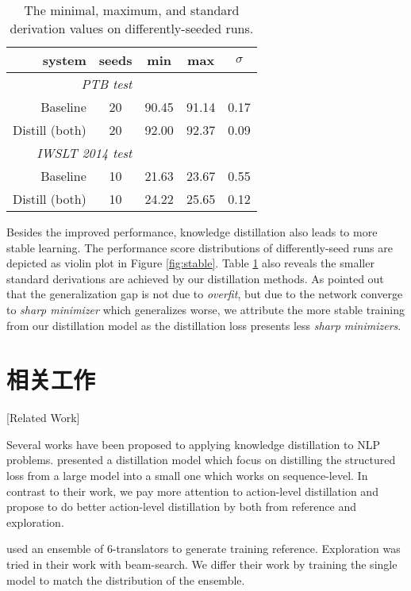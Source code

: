 \begin{table}[t]
	\centering
	\begin{tabular}{rcccc}
		\hline
		system & seeds & min & max & $\sigma$ \\
		\hline
		\multicolumn{2}{r}{\it PTB test} & & & \\
		Baseline & 20 & 90.45 & 91.14 & 0.17 \\
		Distill (both) & 20 & 92.00 & 92.37 & 0.09 \\
		\hline
		\hline
		\multicolumn{2}{r}{\it IWSLT 2014 test} & & & \\
		Baseline & 10 & 21.63 & 23.67 & 0.55 \\
		Distill (both) & 10 & 24.22 & 25.65 & 0.12 \\
		\hline
	\end{tabular}
	\caption{The minimal, maximum, and standard derivation values
		on differently-seeded runs.}\label{tbl:stable}
\end{table}
Besides the improved performance,
knowledge distillation also leads to more stable learning.
The performance score distributions of differently-seed runs are depicted as
violin plot in Figure \ref{fig:stable}. Table \ref{tbl:stable}
also reveals the smaller standard derivations are achieved by
our distillation methods. As \citet{DBLP:journals/corr/KeskarMNST16} pointed out that
the generalization gap is not due to {\it overfit}, but due to
the network converge to {\it sharp minimizer} which generalizes worse,
we attribute the more stable training from our distillation model
as the distillation loss presents less {\it sharp minimizers}.

\section{相关工作}[Related Work]

Several works have been proposed to applying knowledge distillation
to NLP problems. \citet{kim-rush:2016:EMNLP2016} presented
a distillation model which focus on distilling the structured loss
from a large model into a small one which works on sequence-level.
In contrast to their work, we pay more attention to action-level distillation
and propose to do better action-level distillation by both from
reference and exploration.

\citet{DBLP:journals/corr/FreitagAS17} used an ensemble of 6-translators
to generate training reference.
Exploration was tried in their work with beam-search.
We differ their work by training the single model to match
the distribution of the ensemble.

